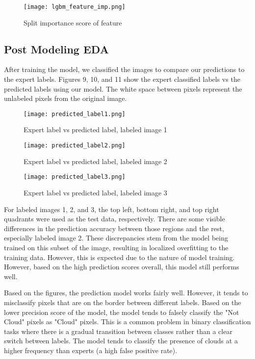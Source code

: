 \documentclass[11pt,letterpaper]{article}
\begin{document}
\begin{figure}[H]
    \centering
    \texttt{[image: lgbm\_feature\_imp.png]}
    \caption{Split importance score of feature}
    \label{fig:enter-label}
\end{figure}

\subsection{Post Modeling EDA}
After training the model, we classified the images to compare our predictions to the expert labels. Figures 9, 10, and 11 show the expert classified labels vs the predicted labels using our model. The white space between pixels represent the unlabeled pixels from the original image.

\begin{figure}[H]
    \centering
    \texttt{[image: predicted\_label1.png]}
    \caption{Expert label vs predicted label, labeled image 1}
    \label{fig:enter-label}
\end{figure}

\begin{figure}[H]
    \centering
    \texttt{[image: predicted\_label2.png]}
    \caption{Expert label vs predicted label, labeled image 2}
    \label{fig:enter-label}
\end{figure}




\begin{figure}[H]
    \centering
    \texttt{[image: predicted\_label3.png]}
    \caption{Expert label vs predicted label, labeled image 3}
    \label{fig:enter-label}
\end{figure}

For labeled images 1, 2, and 3, the top left, bottom right, and top right quadrants were used as the test data, respectively. There are some visible differences in the prediction accuracy between those regions and the rest, especially labeled image 2. These discrepancies stem from the model being trained on this subset of the image, resulting in localized overfitting to the training data. However, this is expected due to the nature of model training. However, based on the high prediction scores overall, this model still performs well.

Based on the figures, the prediction model works fairly well. However, it tends to misclassify pixels that are on the border between different labels. Based on the lower precision score of the model, the model tends to falsely classify the "Not Cloud" pixels as "Cloud" pixels. This is a common problem in binary classification tasks where there is a gradual transition between classes rather than a clear switch between labels. The model tends to classify the presence of clouds at a higher frequency than experts (a high false positive rate). 
\end{document}
